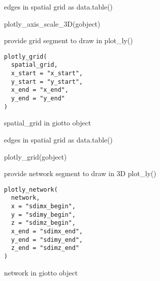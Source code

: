 \documentclass[a4paper]{book}
\begin{document}
%
\begin{Value}
edges in spatial grid as data.table()
\end{Value}
%
\begin{Examples}
\begin{ExampleCode}
    plotly_axis_scale_3D(gobject)
\end{ExampleCode}
\end{Examples}
%
\begin{Description}\relax
provide grid segment to draw in plot\_ly()
\end{Description}
%
\begin{Usage}
\begin{verbatim}
plotly_grid(
  spatial_grid,
  x_start = "x_start",
  y_start = "y_start",
  x_end = "x_end",
  y_end = "y_end"
)
\end{verbatim}
\end{Usage}
%
\begin{Arguments}
\begin{ldescription}
\item[\code{spatial\_grid}] spatial\_grid in giotto object
\end{ldescription}
\end{Arguments}
%
\begin{Value}
edges in spatial grid as data.table()
\end{Value}
%
\begin{Examples}
\begin{ExampleCode}
    plotly_grid(gobject)
\end{ExampleCode}
\end{Examples}
%
\begin{Description}\relax
provide network segment to draw in 3D plot\_ly()
\end{Description}
%
\begin{Usage}
\begin{verbatim}
plotly_network(
  network,
  x = "sdimx_begin",
  y = "sdimy_begin",
  z = "sdimz_begin",
  x_end = "sdimx_end",
  y_end = "sdimy_end",
  z_end = "sdimz_end"
)
\end{verbatim}
\end{Usage}
%
\begin{Arguments}
\begin{ldescription}
\item[\code{gobject}] network in giotto object
\end{ldescription}
\end{Arguments}
\end{document}
